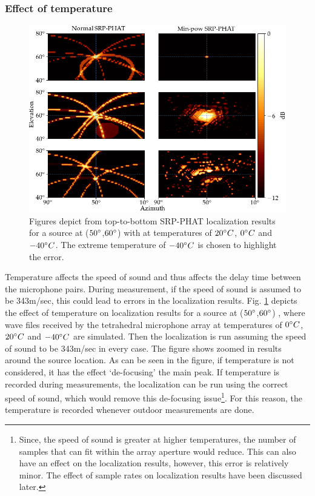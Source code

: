\subsubsection{Effect of temperature}
\begin{figure}[!ht]
\centering
\includegraphics[width=\textwidth]{Figures/tempSim.png}
\caption{Figures depict from top-to-bottom SRP-PHAT localization results for a source at ($50\degree$,$60\degree$) with at temperatures of $20\degree C$, $0\degree C$ and $-40\degree C$. The extreme temperature of $-40\degree C$ is chosen to highlight the error.} 
\label{fig:4mic1srcTemp}
\end{figure}
Temperature affects the speed of sound and thus affects the delay time between the microphone pairs. During measurement, if the speed of sound is assumed to be 343m/sec, this could lead to errors in the localization results. Fig. \ref{fig:4mic1srcTemp} depicts the effect of temperature on localization results for a source at ($50\degree$,$60\degree$) , where wave files received by the tetrahedral microphone array at temperatures of $0\degree C$, $20\degree C$ and $-40\degree C$ are simulated. Then the localization is run assuming the speed of sound to be 343m/sec in every case. The figure shows zoomed in results around the source location. As can be seen in the figure, if temperature is not considered, it has the effect `de-focusing' the main peak. If temperature is recorded during measurements, the localization can be run using the correct speed of sound, which would remove this de-focusing issue\footnote{Since, the speed of sound is greater at higher temperatures, the number of samples that can fit within the array aperture would reduce. This can also have an effect on the localization results, however, this error is relatively minor. The effect of sample rates on localization results have been discussed later.}. For this reason, the temperature is recorded whenever outdoor measurements are done. 
